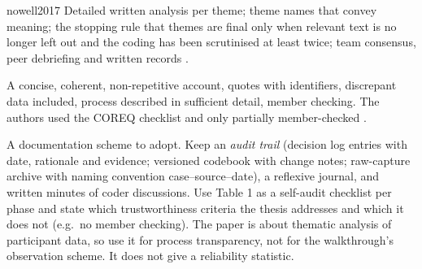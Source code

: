 \begin{papercard}{nowell2017}
 Detailed written analysis per theme; theme names that convey meaning; the stopping rule that themes are final only when relevant text is no longer left out and the coding has been scrutinised at least twice; team consensus, peer debriefing and written records .

 A concise, coherent, non-repetitive account, quotes with identifiers, discrepant data included, process described in sufficient detail, member checking. The authors used the COREQ checklist and only partially member-checked .

 A documentation scheme to adopt. Keep an \emph{audit trail} (decision log entries with date, rationale and evidence; versioned codebook with change notes; raw-capture archive with naming convention case--source--date), a reflexive journal, and written minutes of coder discussions. Use Table 1 as a self-audit checklist per phase and state which trustworthiness criteria the thesis addresses and which it does not (e.g.\ no member checking). The paper is about thematic analysis of participant data, so use it for process transparency, not for the walkthrough's observation scheme. It does not give a reliability statistic.
\end{papercard}
